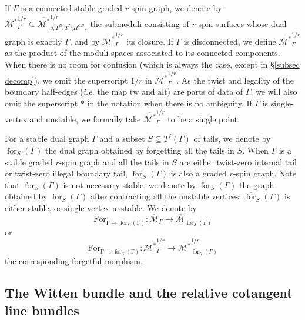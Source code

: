 \documentclass[11pt]{amsart}
\theoremstyle{definition}
\theoremstyle{remark}
\newcommand{\alt}{{\text{alt}}}
\newcommand{\tw}{\text{tw}}
\newcommand{\<}{\left<}
\renewcommand{\>}{\right>}
\numberwithin{equation}{section}
\def\Mbar{{\overline{\mathcal M}}}
\def\Mbarstar{{\overline{\mathcal M^*}}}
\begin{document}
 If $\Gamma$ is a connected stable graded $r$-spin graph, we denote by ${\mathcal M^*}_{\Gamma}^{1/r}\subseteq {\Mbarstar}_{g,  T^B, T^I\setminus H^{CB},}^{1/r}$ the  submoduli consisting of $r$-spin surfaces whose dual graph is exactly $\Gamma$, and by $\overline{{\mathcal M^*}}_{\Gamma}^{1/r}$ its closure. If $\Gamma$ is disconnected, we define $\Mbarstar_{\Gamma}^{1/r}$ as the product of the moduli spaces associated to its connected components. When there is no room for confusion (which is always the case, except in \S \ref{subsec decomp}), we omit the superscript $1/r$ in $\overline{{\mathcal M^*}}_{\Gamma}^{1/r}$. 
 As the twist and legality of the boundary half-edges (\textit{i.e.} the map $\tw$ and $\alt$) are parts of data of $\Gamma$, we will also omit the superscript $*$ in the notation when there is no ambiguity.
 If $\Gamma$ is single-vertex and unstable, we formally take $\Mbarstar^{1/r}_{\Gamma}$ to be a single point.

 For a stable dual graph $\Gamma$ and a subset $S\subseteq T^I(\Gamma)$ of tails, we denote by $\operatorname{for}_S(\Gamma)$ the dual graph obtained by forgetting all the tails in $S$. When $\Gamma$ is a stable graded $r$-spin graph and all the tails in $S$ are either twist-zero internal tail or twist-zero illegal boundary tail, $\operatorname{for}_S(\Gamma)$ is also a graded $r$-spin graph. Note that $\operatorname{for}_S(\Gamma)$ is not necessary stable, we denote by $\overline{\operatorname{for}}_S(\Gamma)$ the graph obtained by $\operatorname{for}_S(\Gamma)$ after contracting all the unstable vertices; $\overline{\operatorname{for}}_S(\Gamma)$ is either stable, or single-vertex unstable. We denote by 
 $$
 \operatorname{For_{\Gamma \to \overline{\operatorname{for}}_S(\Gamma)}}\colon \Mbar_{\Gamma}\to \Mbar_{\overline{\operatorname{for}}_S(\Gamma)}
 $$
 or 
 $$
 \operatorname{For_{\Gamma \to \overline{\operatorname{for}}_S(\Gamma)}}\colon \Mbarstar^{1/r}_{\Gamma}\to \Mbarstar^{1/r}_{\overline{\operatorname{for}}_S(\Gamma)}
 $$
 the corresponding forgetful morphism.



\subsection{The Witten bundle and the relative cotangent line bundles}
\label{subsec Witten bundle}
\end{document}
